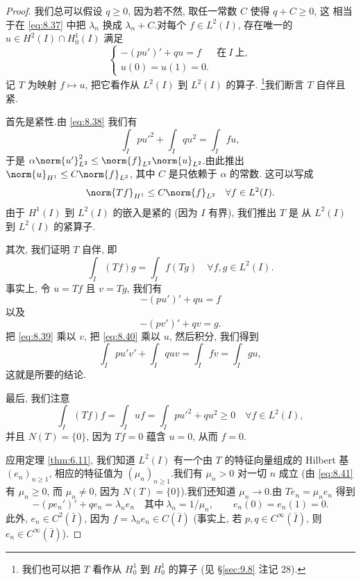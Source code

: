 \begin{proof}
我们总可以假设 $q\ge0$, 因为若不然, 取任一常数 $C$ 使得 $q+C\ge0$, 这
相当于在 \eqref{eq:8.37} 中把 $\lambda_n$ 换成 $\lambda_n+C$.对每个
$f\in L^2(I)$, 存在唯一的 $u\in H^2(I)\cap H_0^1(I)$ 满足
\begin{equation}
\begin{cases}
-(pu')'+qu=f & \text{在}\ I\ \text{上},\\
u(0)=u(1)=0.
\end{cases}
\label{eq:8.38}
\end{equation}
记 $T$ 为映射 $f\mapsto u$, 把它看作从 $L^2(I)$ 到 $L^2(I)$ 的算子.
\footnote{我们也可以把 $T$ 看作从 $H_0^1$ 到 $H_0^1$ 的算子 (见
\S\ref{sec:9.8} 注记 28).}我们断言 $T$ 自伴且紧.

首先是紧性.由 \eqref{eq:8.38} 我们有
\begin{equation*}
\int_I pu'^2+\int_I qu^2=\int_I fu,
\end{equation*}
于是 $\alpha\norm{u'}_{L^2}^2\le\norm{f}_{L^2}\norm{u}_{L^2}$.由此推出
$\norm{u}_{H^1}\le C\norm{f}_{L^2}$, 其中 $C$ 是只依赖于 $\alpha$ 的常数.
这可以写成
\begin{equation*}
\norm{Tf}_{H^1}\le C\norm{f}_{L^2}\quad\forall f\in L^2(I).
\end{equation*}
由于 $H^1(I)$ 到 $L^2(I)$ 的嵌入是紧的 (因为 $I$ 有界), 我们推出 $T$ 是
从 $L^2(I)$ 到 $L^2(I)$ 的紧算子.

其次, 我们证明 $T$ 自伴, 即
\begin{equation*}
\int_I(Tf)g=\int_I f(Tg)\quad\forall f,g\in L^2(I).
\end{equation*}
事实上, 令 $u=Tf$ 且 $v=Tg$, 我们有
\begin{equation}
-(pu')'+qu=f
\label{eq:8.39}
\end{equation}
以及
\begin{equation}
-(pv')'+qv=g.
\label{eq:8.40}
\end{equation}
把 \eqref{eq:8.39} 乘以 $v$, 把 \eqref{eq:8.40} 乘以 $u$, 然后积分, 我们得到
\begin{equation*}
\int_I pu'v'+\int_I quv=\int_I fv=\int_I gu,
\end{equation*}
这就是所要的结论.

最后, 我们注意
\begin{equation}
\int_I(Tf)f=\int_I uf=\int_I pu'^2+qu^2\ge0\quad\forall f\in L^2(I),
\label{eq:8.41}
\end{equation}
并且 $N(T)=\{0\}$, 因为 $Tf=0$ 蕴含 $u=0$, 从而 $f=0$.

应用定理  \ref{thm:6.11}, 我们知道 $L^2(I)$ 有一个由 $T$ 的特征向量组成的
Hilbert 基 $(e_n)_{n\ge1}$, 相应的特征值为 $(\mu_n)_{n\ge1}$.我们有
$\mu_n>0$ 对一切 $n$ 成立 (由 \eqref{eq:8.41} 有 $\mu_n\ge0$, 而
$\mu_n\ne0$, 因为 $N(T)=\{0\}$).我们还知道 $\mu_n\to0$.由
$Te_n=\mu_ne_n$ 得到
\begin{equation*}
-(pe_n')'+qe_n=\lambda_ne_n\quad\text{其中}\ \lambda_n=1/\mu_n,
\qquad e_n(0)=e_n(1)=0.
\end{equation*}
此外, $e_n\in C^2(\bar I)$, 因为 $f=\lambda_ne_n\in C(\bar I)$ (事实上,
若 $p,q\in C^\infty(\bar I)$, 则 $e_n\in C^\infty(\bar I)$).
\end{proof}


